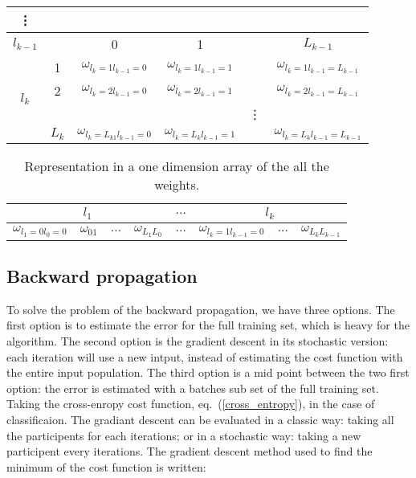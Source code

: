 \documentclass[final, paper=letter,5p,times,twocolumn]{elsarticle}
\begin{document}
\begin{table}[]
\begin{tabular}{|c|c|c|c|c|c|}
\vdots                   &&                                     &                         &        & \\ \hline
$l_{k-1}$                 && 0                                   &  1                      &        &  $L_{k-1}$ \\ \hline
\multirow{4}{*}{$l_{k}$}  &1& $\omega_{l_{k}=1l_{k-1}=0}$            & $\omega_{l_{k}=1l_{k-1}=1}$  &        & $\omega_{l_{k}=1l_{k-1}=L_{k-1}}$ \\ \cline{2-6} 
                         &2& $\omega_{l_{k}=2l_{k-1}=0}$            & $\omega_{l_{k}=2l_{k-1}=1}$  &        &  $\omega_{l_{k}=2l_{k-1}=L_{k-1}}$ \\ \cline{2-6} 
                         &&                                    &                         & \vdots & \\ \cline{2-6} 
                         &$L_{k}$& $\omega_{l_{k}=L_{k1}l_{k-1}=0}$   & $\omega_{l_{k}=L_{k}l_{k-1}=1}$ &        &  $\omega_{l_{k}=L_{k}l_{k-1}=L_{k-1}}$ \\ \hline
\end{tabular}
\end{table}

\begin{table}[]
\centering
\caption{Representation in a one dimension array of the all the weights.}
\label{weights_in_mem}
\begin{tabular}{|c|c|c|c|c|c|c|c|}
\hline
\multicolumn{4}{|c|}{$l_{1}$} & $\hdots$ & \multicolumn{3}{c|}{$l_{k}$} \\ \hline
$\omega_{l_{1}=0l_{0}=0}$   &   $\omega_{01}$   & $\hdots$  &  $\omega_{L_{1}L_{0}}$   & $\hdots$ &    $\omega_{l_{k}=1l_{k-1}=0}$    & $\hdots$  &   $\omega_{L_{k}L_{k-1}}$ \\ \hline
\end{tabular}
\end{table}

\subsection{Backward propagation}

To solve the problem of the backward propagation, we have three options. The first option is to estimate the error for the full training set, which is heavy for the algorithm. The second option is the gradient descent in its stochastic version: each iteration will use a new intput, instead of estimating the cost function with the entire input population. The third option is a mid point between the two first option: the error is estimated with a batches sub set of the full training set.
Taking the cross-enropy cost function, eq.~(\ref{cross_entropy}), in the case of classificaion. The gradiant descent can be evaluated in a classic way: taking all the participents for each iterations; or in a stochastic way: taking a new participent every iterations. The gradient descent method used to find the minimum of the cost function is written:
\end{document}

